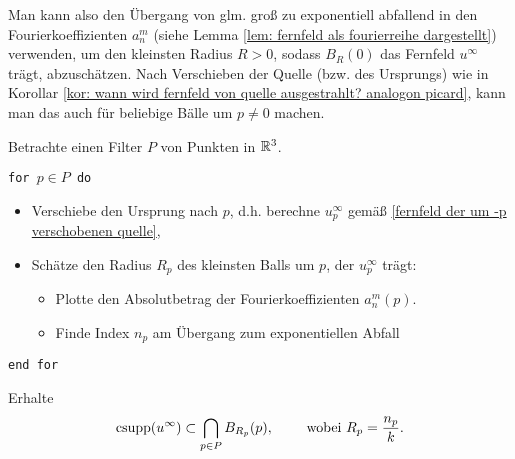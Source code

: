 Man kann also den Übergang von glm. groß zu exponentiell abfallend in den Fourierkoeffizienten \(a_n^m\) (siehe Lemma \ref{lem: fernfeld als fourierreihe dargestellt}) verwenden, um den kleinsten Radius \(R>0\), sodass \(B_R(0)\) das Fernfeld \(u^\infty\) trägt, abzuschätzen. Nach Verschieben der Quelle (bzw. des Ursprungs) wie in Korollar \ref{kor: wann wird fernfeld von quelle ausgestrahlt? analogon picard}, kann man das auch für beliebige Bälle um \(p\neq0\) machen.
\begin{alg}
	Betrachte einen Filter \(P\) von Punkten in \(\mathbb{R}^3\).
	
	\noindent\texttt{for \(p\in P\) do}
	\begin{itemize}
		\item Verschiebe den Ursprung nach \(p\), d.h. berechne \(u_p^\infty\) gemäß \eqref{fernfeld der um -p verschobenen quelle},
		\item Schätze den Radius \(R_p\) des kleinsten Balls um \(p\), der \(u_p^\infty\) trägt:
		\begin{itemize}
			\item Plotte den Absolutbetrag der Fourierkoeffizienten \(a_n^m(p)\).
			\item Finde Index \(n_p\) am Übergang zum exponentiellen Abfall
		\end{itemize}
	\end{itemize}
	\texttt{end for}
	
	Erhalte
	\begin{equation*}
		\operatorname{csupp}(u^\infty)\subset\bigcap_{p\in P}B_{R_p}(p),\qquad\text{ wobei }R_p=\frac{n_p}{k}.
	\end{equation*}\vspace{20mm}
\end{alg}
